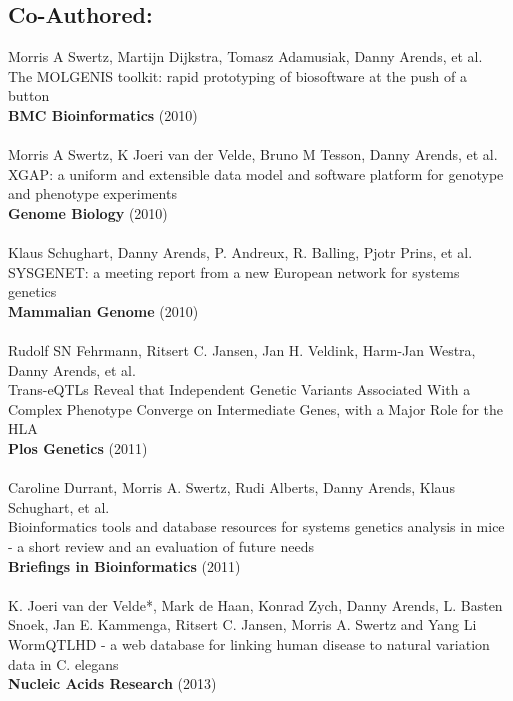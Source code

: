 \documentclass[8pt, twoside]{book}
\newcommand{\authors}[1]{\small{#1}}
\newcommand{\bold}[1]{{\bfseries #1}}
\begin{document}
\subsection*{Co-Authored:}
  \authors{Morris A Swertz, Martijn Dijkstra, Tomasz Adamusiak, Danny Arends, et al.}\\
  The MOLGENIS toolkit: rapid prototyping of biosoftware at the push of a button\\
  \bold{BMC Bioinformatics} (2010)\\\\
  \authors{Morris A Swertz, K Joeri van der Velde, Bruno M Tesson, Danny Arends, et al.}\\
  XGAP: a uniform and extensible data model and software platform for genotype and phenotype experiments\\
  \bold{Genome Biology} (2010)\\\\
  \authors{Klaus Schughart, Danny Arends, P. Andreux, R. Balling, Pjotr Prins, et al.}\\
  SYSGENET: a meeting report from a new European network for systems genetics\\
  \bold{Mammalian Genome} (2010)\\\\
  \authors{Rudolf SN Fehrmann, Ritsert C. Jansen, Jan H. Veldink, Harm-Jan Westra, Danny Arends, et al.}\\
  Trans-eQTLs Reveal that Independent Genetic Variants Associated With a Complex Phenotype Converge on 
  Intermediate Genes, with a Major Role for the HLA\\
  \bold{Plos Genetics} (2011)\\\\
  \authors{Caroline Durrant, Morris A. Swertz, Rudi Alberts, Danny Arends, Klaus Schughart, et al.}\\
  Bioinformatics tools and database resources for systems genetics analysis in mice - a short review 
  and an evaluation of future needs\\
  \bold{Briefings in Bioinformatics} (2011)\\\\
  \authors{K. Joeri van der Velde*, Mark de Haan, Konrad Zych, Danny Arends, L. Basten Snoek, 
           Jan E. Kammenga, Ritsert C. Jansen, Morris A. Swertz and Yang Li}\\
  WormQTLHD - a web database for linking human disease to natural variation data in C. elegans\\
  \bold{Nucleic Acids Research} (2013)
\end{document}

